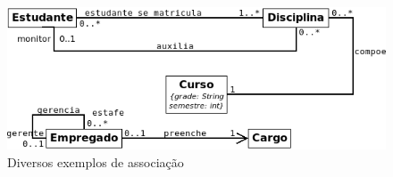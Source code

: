 \documentclass[
	11pt,				%
	openright,
	twoside,			%
	a4paper,			%
	english,			%
	french,
	brazil,				%
	sumario=tradicional
	]{abntex2}
\begin{document}
\begin{figure}
\begin{center}
\includegraphics[scale=0.6]{assocCls2.png} 
\caption{Diversos exemplos de associação} \label{fig:uml6}
\end{center}
\end{figure}
\end{document}
